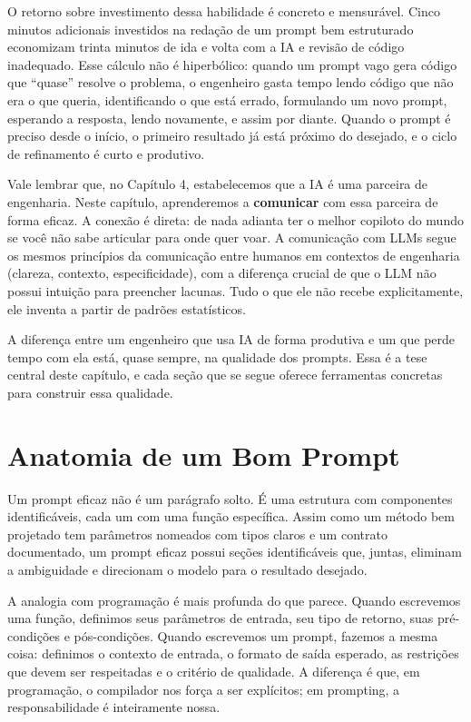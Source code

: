 O retorno sobre investimento dessa habilidade é concreto e mensurável. Cinco
minutos adicionais investidos na redação de um prompt bem estruturado economizam
trinta minutos de ida e volta com a IA e revisão de código inadequado. Esse
cálculo não é hiperbólico: quando um prompt vago gera código que ``quase''
resolve o problema, o engenheiro gasta tempo lendo código que não era o que
queria, identificando o que está errado, formulando um novo prompt, esperando a
resposta, lendo novamente, e assim por diante. Quando o prompt é preciso desde o
início, o primeiro resultado já está próximo do desejado, e o ciclo de refinamento
é curto e produtivo.

Vale lembrar que, no Capítulo 4, estabelecemos que a IA é uma parceira de
engenharia. Neste capítulo, aprenderemos a \textbf{comunicar} com essa parceira
de forma eficaz. A conexão é direta: de nada adianta ter o melhor copiloto do
mundo se você não sabe articular para onde quer voar. A comunicação com LLMs
segue os mesmos princípios da comunicação entre humanos em contextos de
engenharia (clareza, contexto, especificidade), com a diferença crucial de
que o LLM não possui intuição para preencher lacunas. Tudo o que ele não recebe
explicitamente, ele inventa a partir de padrões estatísticos.

A diferença entre um engenheiro que usa IA de forma produtiva e um que perde
tempo com ela está, quase sempre, na qualidade dos prompts. Essa é a tese central
deste capítulo, e cada seção que se segue oferece ferramentas concretas para
construir essa qualidade.

\section{Anatomia de um Bom Prompt}

Um prompt eficaz não é um parágrafo solto. É uma estrutura com componentes
identificáveis, cada um com uma função específica. Assim como um método bem
projetado tem parâmetros nomeados com tipos claros e um contrato documentado, um
prompt eficaz possui seções identificáveis que, juntas, eliminam a ambiguidade e
direcionam o modelo para o resultado desejado.

A analogia com programação é mais profunda do que parece. Quando escrevemos uma
função, definimos seus parâmetros de entrada, seu tipo de retorno, suas
pré-condições e pós-condições. Quando escrevemos um prompt, fazemos a
mesma coisa: definimos o contexto de entrada, o formato de saída esperado, as
restrições que devem ser respeitadas e o critério de qualidade. A diferença é que,
em programação, o compilador nos força a ser explícitos; em prompting, a
responsabilidade é inteiramente nossa.


